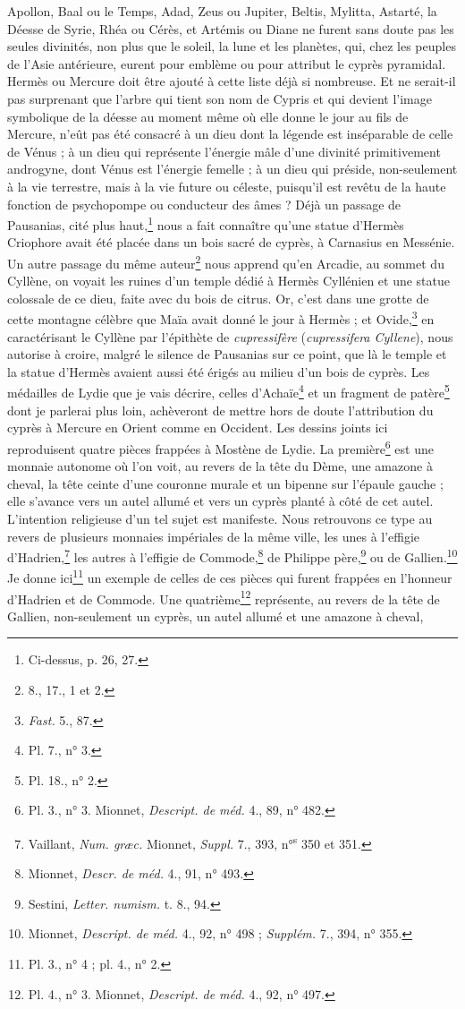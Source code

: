 \documentclass{article}
\begin{document}
Apollon, Baal ou le Temps, Adad, Zeus ou Jupiter, Beltis, Mylitta, Astarté, la Déesse de Syrie, Rhéa ou Cérès, et Artémis ou Diane ne furent sans doute pas les seules divinités, non plus que le soleil, la lune et les planètes, qui, chez les peuples de l'Asie antérieure, eurent pour emblème ou pour attribut le cyprès pyramidal. Hermès ou Mercure doit être ajouté à cette liste déjà si nombreuse. Et ne serait-il pas surprenant que l'arbre qui tient son nom de Cypris et qui devient l'image symbolique de la déesse au moment même où elle donne le jour au fils de Mercure, n'eût pas été consacré à un dieu dont la légende est inséparable de celle de Vénus ; à un dieu qui représente l'énergie mâle d'une divinité primitivement androgyne, dont Vénus est l'énergie femelle ; à un dieu qui préside, non-seulement à la vie terrestre, mais à la vie future ou céleste, puisqu'il est revêtu de la haute fonction de psychopompe ou conducteur des âmes ? Déjà un passage de Pausanias, cité plus haut,\footnote{Ci-dessus, p. 26, 27.} nous a fait connaître qu'une statue d'Hermès Criophore avait été placée dans un bois sacré de cyprès, à Carnasius en Messénie. Un autre passage du même auteur\footnote{8., 17., 1 et 2.} nous apprend qu'en Arcadie, au sommet du Cyllène, on voyait les ruines d'un temple dédié à Hermès Cyllénien et une statue colossale de ce dieu, faite avec du bois de citrus. Or, c'est dans une grotte de cette montagne célèbre que Maïa avait donné le jour à Hermès ; et Ovide,\footnote{\emph{Fast.} 5., 87.} en caractérisant le Cyllène par l'épithète de \emph{cupressifère} (\emph{cupressifera Cyllene}), nous autorise à croire, malgré le silence de Pausanias sur ce point, que là le temple et la statue d'Hermès avaient aussi été érigés au milieu d'un bois de cyprès. Les médailles de Lydie que je vais décrire, celles d'Achaïe\footnote{Pl. 7., n° 3.} et un fragment de patère\footnote{Pl. 18., n° 2.} dont je parlerai plus loin, achèveront de mettre hors de doute l'attribution du cyprès à Mercure en Orient comme en Occident. Les dessins joints ici reproduisent quatre pièces frappées à Mostène de Lydie. La première\footnote{Pl. 3., n° 3. Mionnet, \emph{Descript. de méd.} 4., 89, n° 482.} est une monnaie autonome où l'on voit, au revers de la tête du Dème, une amazone à cheval, la tête ceinte d'une couronne murale et un bipenne sur l'épaule gauche ; elle s'avance vers un autel allumé et vers un cyprès planté à côté de cet autel. L'intention religieuse d'un tel sujet est manifeste. Nous retrouvons ce type au revers de plusieurs monnaies impériales de la même ville, les unes à l'effigie d'Hadrien,\footnote{Vaillant, \emph{Num. græc.} Mionnet, \emph{Suppl.} 7., 393, n°\textsuperscript{s} 350 et 351.} les autres à l'effigie de Commode,\footnote{Mionnet, \emph{Descr. de méd.} 4., 91, n° 493.} de Philippe père,\footnote{Sestini, \emph{Letter. numism.} t. 8., 94.} ou de Gallien.\footnote{Mionnet, \emph{Descript. de méd.} 4., 92, n° 498 ; \emph{Supplém.} 7., 394, n° 355.} Je donne ici\footnote{Pl. 3., n° 4 ; pl. 4., n° 2.} un exemple de celles de ces pièces qui furent frappées en l'honneur d'Hadrien et de Commode. Une quatrième\footnote{Pl. 4., n° 3. Mionnet, \emph{Descript. de méd.} 4., 92, n° 497.} représente, au revers de la tête de Gallien, non-seulement un cyprès, un autel allumé et une amazone à cheval, 
\end{document}
